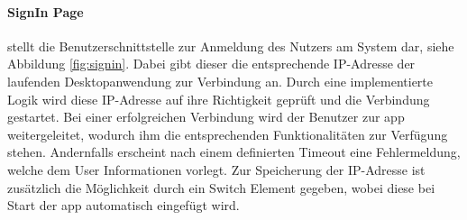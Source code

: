\paragraph{SignIn Page} stellt die Benutzerschnittstelle zur Anmeldung des Nutzers am System dar, siehe Abbildung \ref{fig:signin}. Dabei gibt dieser die entsprechende IP-Adresse der laufenden Desktopanwendung zur Verbindung an. Durch eine implementierte Logik wird diese IP-Adresse auf ihre Richtigkeit geprüft und die Verbindung gestartet. Bei einer erfolgreichen Verbindung wird der Benutzer zur \gls{app} weitergeleitet, wodurch ihm die entsprechenden Funktionalitäten zur Verfügung stehen. Andernfalls erscheint nach einem definierten Timeout eine Fehlermeldung, welche dem User Informationen vorlegt. Zur Speicherung der IP-Adresse ist zusätzlich die Möglichkeit durch ein Switch Element gegeben, wobei diese bei Start der \gls{app} automatisch eingefügt wird.

